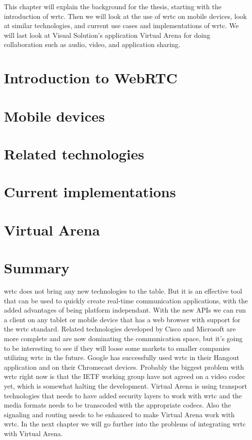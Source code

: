
This chapter will explain the background for the thesis, starting with the introduction of \gls{wrtc}. Then we will look at the use of \gls{wrtc} on mobile devices, look at similar technologies, and current use cases and implementations of \gls{wrtc}. We will last look at Visual Solution's application Virtual Arena for doing collaboration such as audio, video, and application sharing.

\section{Introduction to WebRTC}


\newpage
\section{Mobile devices}


\newpage
\section{Related technologies}


\newpage
\section{Current implementations}


\newpage
\section{Virtual Arena}


\newpage
\section{Summary}
\gls{wrtc} does not bring any new technologies to the table. But it is an effective tool that can be used to quickly create real-time communication applications, with the added advantages of being platform independant. With the new APIs we can run a client on any tablet or mobile device that has a web browser with support for the \gls{wrtc} standard. Related technologies developed by Cisco and Microsoft are more complete and are now dominating the communication space, but it's going to be interesting to see if they will loose some markets to smaller companies utilizing \gls{wrtc} in the future. Google has successfully used \gls{wrtc} in their Hangout application and on their Chromecast devices. Probably the biggest problem with \gls{wrtc} right now is that the IETF working group have not agreed on a video codec yet, which is somewhat halting the development. Virtual Arena is using transport technologies that needs to have added security layers to work with \gls{wrtc} and the media formats needs to be transcoded with the appropriate codecs. Also the signaling and routing needs to be enhanced to make Virtual Arena work with \gls{wrtc}. In the next chapter we will go further into the problems of integrating \gls{wrtc} with Virtual Arena.
